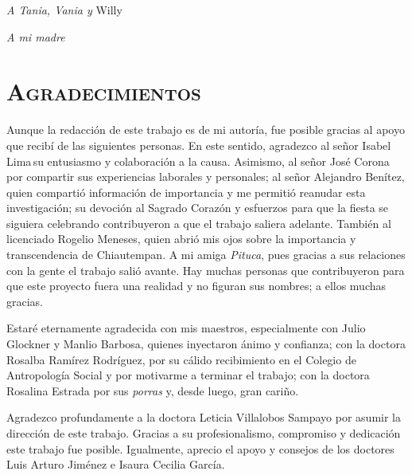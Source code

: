 \documentclass[14pt,letterpaper,twoside]{extbook} %
\begin{document}
\newpage
\pagestyle{empty}
\null\vfill

\newpage
\pagestyle{empty}
\null\vfill

\newpage
\pagestyle{empty}


\begin{flushright}
\textit{A Tania, Vania y} Willy
\end{flushright}
\begin{flushright}
\textit{A mi madre}\textsuperscript\textdagger
\end{flushright}


\newpage
\pagestyle{empty}
\null\vfill

\chapter*{\centering\mdseries\Large\textsc{Agradecimientos}}
\pagestyle{empty}
\setcounter{page}{11}

\noindent Aunque la redacción de este trabajo es de mi autoría, fue posible gracias al apoyo que recibí de las siguientes personas. En este sentido, agradezco al señor Isabel Lima\textsuperscript\textdagger\,su entusiasmo y colaboración a la causa. Asimismo, al señor José Corona\textsuperscript\textdagger\,por compartir sus experiencias laborales y personales; al señor Alejandro Benítez, quien compartió información de importancia y me permitió reanudar esta investigación; su devoción al Sagrado Corazón y esfuerzos para que la fiesta se siguiera celebrando contribuyeron a que el trabajo saliera adelante. También al licenciado Rogelio Meneses, quien abrió mis ojos sobre la importancia y transcendencia de Chiautempan. A mi amiga \textit{Pituca}, pues gracias a sus relaciones con la gente el trabajo salió avante. Hay muchas personas que contribuyeron para que este proyecto fuera una realidad y no figuran sus nombres; a ellos muchas gracias.

Estaré eternamente agradecida con mis maestros, especialmente con Julio Glockner y Manlio Barbosa, quienes inyectaron ánimo y confianza; con la doctora Rosalba Ramírez Rodríguez, por su cálido recibimiento en el Colegio de Antropología Social y por motivarme a terminar el trabajo; con la doctora Rosalina Estrada por sus \textit{porras} y, desde luego, gran cariño.

Agradezco profundamente a la doctora Leticia Villalobos Sampayo por asumir la dirección de este trabajo. Gracias a su profesionalismo, compromiso y dedicación este trabajo fue posible. Igualmente, aprecio el apoyo y consejos de los doctores Luis Arturo Jiménez e Isaura Cecilia García.
\end{document}
